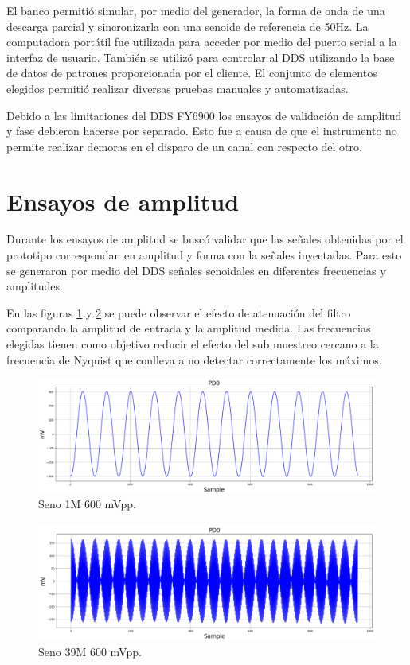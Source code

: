 El banco permitió simular, por medio del generador, la forma de onda de una descarga parcial y sincronizarla con una senoide de referencia de 50Hz. La computadora portátil fue utilizada para acceder por medio del puerto serial a la interfaz de usuario. También se utilizó para controlar al DDS utilizando la base de datos de patrones proporcionada por el cliente. El conjunto de elementos elegidos permitió realizar diversas pruebas manuales y automatizadas.

Debido a las limitaciones del DDS FY6900 los ensayos de validación de amplitud y fase debieron hacerse por separado. Esto fue a causa de que el instrumento no permite realizar demoras en el disparo de un canal con respecto del otro.


\section{Ensayos de amplitud}
Durante los ensayos de amplitud se buscó validar que las señales obtenidas por el prototipo correspondan en amplitud y forma con la señales inyectadas. Para esto se generaron por medio del DDS señales senoidales en diferentes frecuencias y amplitudes.

En las figuras \ref{fig:sin1} y \ref{fig:sin39} se puede observar el efecto de atenuación del filtro comparando la amplitud de entrada y la amplitud medida. Las frecuencias elegidas tienen como objetivo reducir el efecto del sub muestreo cercano a la frecuencia de Nyquist que conlleva a no detectar correctamente los máximos.

\begin{figure}[ht]
	\centering
	\includegraphics[width=140mm]{./Figures/sin1.png}
	\caption{Seno 1M 600 mVpp.}
	\label{fig:sin1}
\end{figure}

\begin{figure}[ht]
	\centering
	\includegraphics[width=140mm]{./Figures/sin39.png}
	\caption{Seno 39M 600 mVpp.}
	\label{fig:sin39}
\end{figure}

